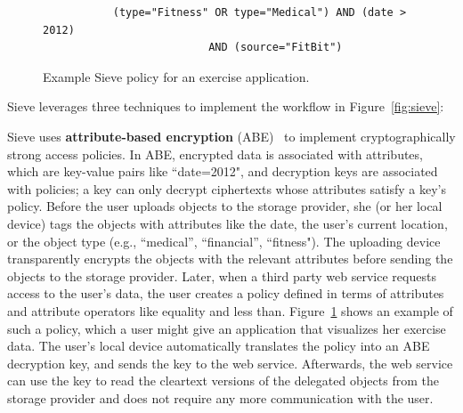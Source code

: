 \begin{figure}
\centering
\begin{verbatim}
           (type="Fitness" OR type="Medical") AND (date > 2012) 
                          AND (source="FitBit") 
\end{verbatim}
\caption[Example Sieve policy]{Example Sieve policy for an exercise application.}
\label{fig:policyex}
\end{figure}

Sieve leverages three techniques to implement
the workflow in Figure~\ref{fig:sieve}:\\
\begin{smitemize}
  \item Sieve uses \textbf{attribute-based encryption}
  (ABE)~\cite{kpabe} to implement cryptographically strong access
  policies. In ABE, encrypted data is 
  associated with attributes, which are key-value 
  pairs like ``date=2012", and decryption keys are 
  associated with policies; a key can only
  decrypt ciphertexts whose attributes satisfy a key's
  policy. Before the user uploads
  objects to the storage provider, she (or her local
  device) tags the objects with attributes like the
  date, the user's current location, or the object type
  (e.g., ``medical'', ``financial'', ``fitness").
  The uploading device transparently encrypts the objects
  with the relevant attributes before sending the objects to
  the storage provider. Later, when a third party web service 
  requests access to the user's data, the user creates a policy
  defined in terms of attributes and attribute
  operators like equality and less than. Figure~\ref{fig:policyex}
  shows an example of such a policy, which a user
  might give an application that visualizes her exercise data.
  The user's local device automatically translates the
  policy into an ABE decryption key, and sends the key
  to the web service. Afterwards, the web service can use
  the key to read the cleartext versions of the delegated
  objects from the storage provider and does not require
  any more communication with the user.
  

\end{smitemize}
